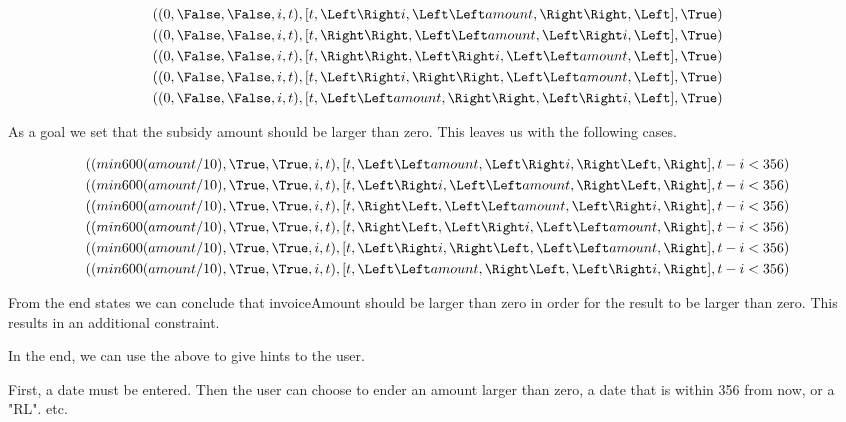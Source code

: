 \begin{align*}
  ((                  0&, \False,\False, i, t),[t,\Left \Right i, \Left \Left amount, \Right \Right, \Left],\True)\\
  ((                  0&, \False,\False, i, t),[t,\Right \Right,\Left \Left amount, \Left \Right i, \Left],\True)\\
  ((                  0&, \False,\False, i, t),[t,\Right \Right, \Left \Right i, \Left \Left amount, \Left],\True)\\
  ((                  0&, \False,\False, i, t),[t, \Left \Right i, \Right \Right, \Left \Left amount, \Left],\True)\\
  ((                  0&, \False,\False, i, t),[t, \Left \Left amount, \Right \Right, \Left \Right i, \Left],\True)\\
\end{align*}


As a goal we set that the subsidy amount should be larger than zero. This leaves us with the following cases.


\begin{align*}
  ((min 600 (amount/10)&,  \True, \True, i, t),[t,\Left \Left amount,     \Left \Right i, \Right \Left, \Right],t-i<356)\\
  ((min 600 (amount/10)&,  \True, \True, i, t),[t,    \Left \Right i, \Left \Left amount, \Right \Left, \Right],t-i<356)\\
  ((min 600 (amount/10)&,  \True, \True, i, t),[t,      \Right \Left, \Left \Left amount, \Left \Right i, \Right],t-i<356)\\
  ((min 600 (amount/10)&,  \True, \True, i, t),[t,      \Right \Left, \Left \Right i, \Left \Left amount, \Right],t-i<356)\\
  ((min 600 (amount/10)&,  \True, \True, i, t),[t,    \Left \Right i, \Right \Left, \Left \Left amount, \Right],t-i<356)\\
  ((min 600 (amount/10)&,  \True, \True, i, t),[t,\Left \Left amount, \Right \Left, \Left \Right i, \Right],t-i<356)\\
\end{align*}

From the end states we can conclude that invoiceAmount should be larger than zero in order for the result to be larger than zero. This results in an additional constraint.

In the end, we can use the above to give hints to the user.

First, a date must be entered. Then the user can choose to ender an amount larger than zero, a date that is within 356 from now, or a "RL".
etc.
